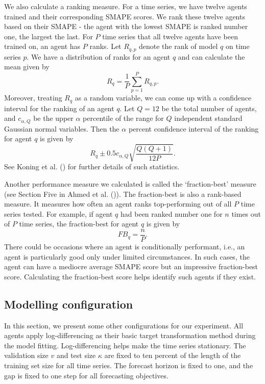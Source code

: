We also calculate a ranking measure. For a time series, we have twelve agents trained and their corresponding SMAPE scores. We rank these twelve agents based on their SMAPE - the agent with the lowest SMAPE is ranked number one, the largest the last. For $P$ time series that all twelve agents have been trained on, an agent has $P$ ranks. Let $R_{q, p}$ denote the rank of model $q$ on time series $p$. We have a distribution of ranks for an agent $q$ and can calculate the mean given by
\begin{equation*}
    R_q = \frac{1}{P} \sum_{p = 1}^{P}R_{q, p}.
\end{equation*}
Moreover, treating $R_q$ as a random variable, we can come up with a confidence interval for the ranking of an agent $q$. Let $Q = 12$ be the total number of agents, and $c_{\alpha, Q}$ be the upper $\alpha$ percentile of the range for $Q$ independent standard Gaussian normal variables. Then the $\alpha$ percent confidence interval of the ranking for agent $q$ is given by
\begin{equation*}
    R_q \pm 0.5 c_{\alpha, Q} \sqrt{\frac{Q(Q+1)}{12 P}}.
\end{equation*}
See Koning et al. (\citeyear{KONING2005397}) for further details of such statistics.

Another performance measure we calculated is called the `fraction-best' measure (see Section Five in Ahmed et al. (\citeyear{2010EmpiricalMLComparison})). The fraction-best is also a rank-based measure. It measures how often an agent ranks top-performing out of all $P$ time series tested. For example, if agent $q$ had been ranked number one for $n$ times out of $P$ time series, the fraction-best for agent $q$ is given by
\begin{equation*}
    FB_q = \frac{n}{P}.
\end{equation*}
There could be occasions where an agent is conditionally performant, i.e., an agent is particularly good only under limited circumstances. In such cases, the agent can have a mediocre average SMAPE score but an impressive fraction-best score. Calculating the fraction-best score helps identify such agents if they exist.

\subsection{Modelling configuration}
In this section, we present some other configurations for our experiment. All agents apply log-differencing as their basic target transformation method during the model fitting. Log-differencing helps make the time series stationary. The validation size $v$ and test size $\kappa$ are fixed to ten percent of the length of the training set size for all time series. The forecast horizon is fixed to one, and the gap is fixed to one step for all forecasting objectives.

